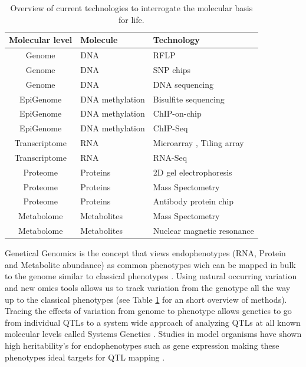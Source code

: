 \begin{table}[h]
  \centering
  {\footnotesize
  \begin{tabular}{ | c | l | l | }
    \hline
    {\bf Molecular level} & {\bf Molecule} & {\bf Technology}\\
    \hline
    \hline
\rowcolor{gray!35}    Genome          & DNA                & RFLP \cite{Lander:1986} \\
\rowcolor{gray!35}    Genome          & DNA                & SNP chips \cite{Hacia:1999} \\
\rowcolor{gray!35}    Genome          & DNA                & DNA sequencing \cite{Mardis:2008} \\
    \hline
    EpiGenome       & DNA methylation    & Bisulfite sequencing \cite{Hayatsu:2007} \\
    EpiGenome       & DNA methylation    & ChIP-on-chip \cite{Collas:2010} \\
    EpiGenome       & DNA methylation    & ChIP-Seq \cite{Park:2009} \\
    \hline
    \hline
\rowcolor{gray!35}    Transcriptome   & RNA          & Microarray \cite{Lashkari:1997}, Tiling array \cite{Lee:2013} \\
\rowcolor{gray!35}    Transcriptome   & RNA          & RNA-Seq \cite{Wang:2009}\\
    \hline
    Proteome        & Proteins     & 2D gel electrophoresis \cite{O'Farrell:1975}\\
    Proteome        & Proteins     & Mass Spectometry \cite{Deshaies:2001}\\
    Proteome        & Proteins     & Antibody protein chip \cite{Fasolo:2009} \\
    \hline
\rowcolor{gray!35}    Metabolome      & Metabolites  & Mass Spectometry \cite{Aebersold:2003} \\
\rowcolor{gray!35}    Metabolome      & Metabolites  & Nuclear magnetic resonance \cite{Espina:2009} \\
    \hline
  \end{tabular}
  }
  \caption[Overview]{Overview of current technologies to interrogate the molecular basis for life.}
    \label{tbl:overview}
\end{table}

Genetical Genomics is the concept that views endophenotypes (RNA, Protein and Metabolite abundance) 
as common phenotypes wich can be mapped in bulk to the genome similar to classical 
phenotypes \cite{Jansen:2001a}. Using natural occurring variation and new omics tools allows us 
to track variation from the genotype all the way up to the classical phenotypes (see Table 
\ref{tbl:overview} for an short overview of methods). Tracing the effects of variation from 
genome to phenotype allows genetics to go from individual QTLs to a system wide approach of 
analyzing QTLs at all known molecular levels called Systems Genetics \cite{Threadgill:2006, Nadeau:2011}.
Studies in model organisms have shown high heritability's for endophenotypes such as gene 
expression making these phenotypes ideal targets for QTL mapping \cite{Brem:2002, Yvert:2003, Morley:2004}. 

